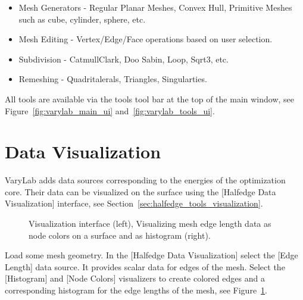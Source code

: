 \documentclass[Thesis.tex]{subfiles}
\begin{document}
\begin{itemize}
\item Mesh Generators - Regular Planar Meshes, Convex Hull, Primitive Meshes such as cube, cylinder, sphere, etc.
\item Mesh Editing - Vertex/Edge/Face operations based on user selection.
\item Subdivision - CatmullClark, Doo Sabin, Loop, Sqrt3, etc.
\item Remeshing - Quadritalerals, Triangles, Singularties.
\end{itemize}

All tools are available via the tools tool bar at the top of the main window, see Figure~\ref{fig:varylab_main_ui} and~\ref{fig:varylab_tools_ui}.

\section{Data Visualization}

{\sc VaryLab} adds data sources corresponding to the energies of the optimization core. Their data can be visualized on the surface using the [Halfedge Data Visualization] interface, see Section~\ref{sec:halfedge_tools_visualization}. 

\begin{figure}
    \begin{center}
    \caption{Visualization interface (left), Visualizing mesh edge length data as node colors on a surface and as histogram (right).}
    \label{fig:visualizing_edge_lengths}
    \end{center}
\end{figure}

\begin{example} Load some mesh geometry. In the [Halfedge Data Visualization] select the [Edge Length] data source. It provides scalar data for edges of the mesh. Select the [Histogram] and [Node Colors] visualizers to create colored edges and a corresponding histogram for the edge lengths of the mesh, see Figure~\ref{fig:visualizing_edge_lengths}.
\end{example}


\end{document}
